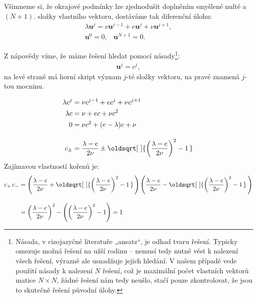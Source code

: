 \documentclass[10pt,a4paper]{article}
\renewcommand*{\sqrt}[2][\ ]{\oldsqrt[#1]{#2\,}\,}
\begin{document}
Všimneme si, že okrajové podmínky lze zjednodušit doplněním smyšlené nulté a $(N+1)$. složky vlastního vektoru, dostáváme tak diferenční úlohu:
\begin{gather*}
    \lambda \bm{u}^j = \nu \bm{u}^{j-1} + e \bm{u}^j + \nu \bm{u}^{j+1}, \\
    \bm{u}^0 = 0, \;\;\; \bm{u}^{N+1} = 0.
\end{gather*}

Z nápovědy víme, že máme řešení hledat pomocí násady\footnote{Násada, v cizojazyčné literatuře „ansatz“, je odhad tvaru řešení. Typicky omezuje možná řešení na užší rodinu – nemusí tedy nutně vést k nalezení všech řešení, výrazně ale usnadňuje jejich hledání. V našem případě vede použití násady k nalezení $N$ řešení, což je maximální počet vlastních vektorů matice $N\times N$, žádné řešení nám tedy neušlo, stačí pouze zkontrolovat, že jsou to skutečně řešení původní úlohy.}:
\begin{align*}
    \bm{u}^j = c^j,
\end{align*}
na levé straně má horní skript význam $j$-té složky vektoru, na pravé znamená $j$-tou mocninu.

\begin{align*}
    \lambda c^j &= \nu c^{j-1} + e c^j + \nu c^{j+1} \\
    \lambda c &= \nu + e c + \nu c^2 \\
    0 &= \nu c^2 + (e-\lambda) c + \nu \\[10pt]
    c_{\pm} &= \frac{\lambda-e}{2\nu} \pm \sqrt{\left(\frac{\lambda-e}{2\nu}\right)^2 - 1}
\end{align*}
Zajímavou vlastností kořenů je:
\begin{align*}
    c_{+} \, c_{-} &=
    \left(
        \frac{\lambda-e}{2\nu} +
        \sqrt{\left(\frac{\lambda-e}{2\nu}\right)^2 - 1}
    \right)
    \left(
        \frac{\lambda-e}{2\nu} -
        \sqrt{\left(\frac{\lambda-e}{2\nu}\right)^2 - 1}
    \right)
    \\[10pt]
    &=
    \left(\frac{\lambda-e}{2\nu}\right)^2 -
    \left( \left(\frac{\lambda-e}{2\nu}\right)^2 - 1 \right)
    = 1
    \\
\end{align*}
\end{document}

